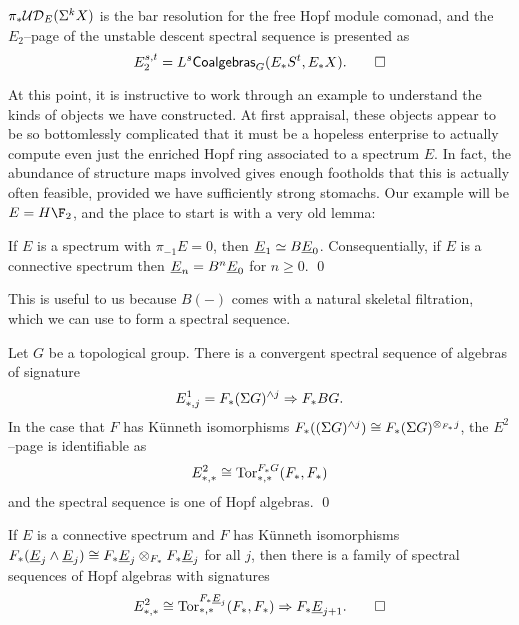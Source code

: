 \begin{theorem}
$\pi_* \mathcal{UD}_E(\Sigma^k X)$ is the bar resolution for the free Hopf module comonad, and the $E_2$--page of the unstable descent spectral sequence is presented as \[E_2^{s, t} = L^s\mathsf{Coalgebras}_G(E_* S^t, E_* X). \qed\]
\end{theorem}

At this point, it is instructive to work through an example to understand the kinds of objects we have constructed.  At first appraisal, these objects appear to be so bottomlessly complicated that it must be a hopeless enterprise to actually compute even just the enriched Hopf ring associated to a spectrum $E$.  In fact, the abundance of structure maps involved gives enough footholds that this is actually often feasible, provided we have sufficiently strong stomachs.  Our example will be $E = H\F_2$, and the place to start is with a very old lemma:
\begin{lemma}
If $E$ is a spectrum with $\pi_{-1} E = 0$, then $\underline{\smash{E}}_{1} \simeq B\underline{\smash{E}}_{0}$.  Consequentially, if $E$ is a connective spectrum then $\underline{\smash{E}}_{n} = B^n \underline{\smash{E}}_{0}$ for $n \ge 0$. \qed
\end{lemma}
\noindent This is useful to us because $B(-)$ comes with a natural skeletal filtration, which we can use to form a spectral sequence.
\begin{lemma}
Let $G$ be a topological group.  There is a convergent spectral sequence of algebras of signature \[E^1_{*, j} = F_*(\Sigma G)^{\wedge j} \Rightarrow F_* BG.\]  In the case that $F$ has K\"unneth isomorphisms $F_*((\Sigma G)^{\wedge j}) \cong F_*(\Sigma G)^{\otimes_{F_*} j}$, the $E^2$--page is identifiable as \[E^2_{*, *} \cong \operatorname{Tor}^{F_* G}_{*, *}(F_*, F_*)\] and the spectral sequence is one of Hopf algebras. \qed
\end{lemma}
\begin{corollary}
If $E$ is a connective spectrum and $F$ has K\"unneth isomorphisms $F_*(\underline{\smash{E}}_{j} \wedge \underline{\smash{E}}_{j}) \cong F_* \underline{\smash{E}}_{j} \otimes_{F_*} F_* \underline{\smash{E}}_{j}$ for all $j$, then there is a family of spectral sequences of Hopf algebras with signatures \[E^2_{*, *} \cong \operatorname{Tor}^{F_* \underline{\smash{E}}_{j}}_{*, *}(F_*, F_*) \Rightarrow F_* \underline{\smash{E}}_{j+1}. \qed\]
\end{corollary}

